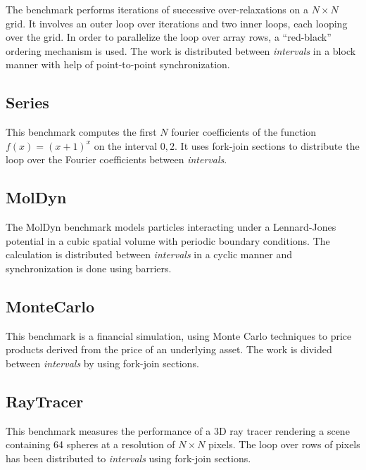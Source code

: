 The benchmark performs iterations of successive over-relaxations on a
$N \times N$ grid. It involves an outer loop over iterations and two
inner loops, each looping over the grid. In order to parallelize the
loop over array rows, a ``red-black'' ordering mechanism is used. The
work is distributed between \emph{intervals} in a block manner with
help of point-to-point synchronization.

\subsection*{Series}

This benchmark computes the first $N$ fourier coefficients of the
function $f(x) = (x+1)^x$ on the interval $0,2$. It uses fork-join
sections to distribute the loop over the Fourier coefficients between
\emph{intervals}.

\subsection*{MolDyn}

The MolDyn benchmark models particles interacting under a
Lennard-Jones potential in a cubic spatial volume with periodic
boundary conditions. The calculation is distributed between
\emph{intervals} in a cyclic manner and synchronization is done using
barriers.

\subsection*{MonteCarlo}

This benchmark is a financial simulation, using Monte Carlo techniques
to price products derived from the price of an underlying asset. The
work is divided between \emph{intervals} by using fork-join sections.

\subsection*{RayTracer}

This benchmark measures the performance of a 3D ray tracer rendering a
scene containing 64 spheres at a resolution of $N \times N$
pixels. The loop over rows of pixels has been distributed to
\emph{intervals} using fork-join sections.



